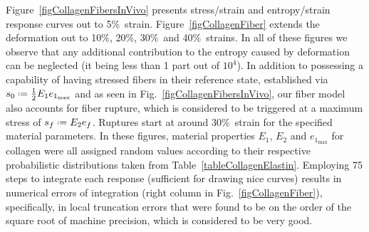 Figure~\ref{figCollagenFibersInVivo} presents stress\slash strain and entropy\slash strain response curves out to 5\%\ strain.  Figure~\ref{figCollagenFiber} extends the deformation out to 10\%, 20\%, 30\%\ and 40\%\ strains.  In all of these figures we observe that any additional contribution to the entropy caused by deformation can be neglected (it being less than 1 part out of $10^4$).  In addition to possessing a capability of having stressed fibers in their reference state, established via $s_0 \defeq \tfrac{1}{2} E_1 e_{1_{\max}}$ and as seen in Fig.~\ref{figCollagenFibersInVivo}, our fiber model also accounts for fiber rupture, which is considered to be triggered at a maximum stress of $s_f \defeq E_2 e_f$.  Ruptures start at around 30\%\ strain for the specified material parameters.  In these figures, material properties  $E_1$, $E_2$ and $e_{1_{\max}}$ for collagen were all assigned random values according to their respective probabilistic distributions taken from Table~\ref{tableCollagenElastin}.  Employing 75 steps to integrate each response (sufficient for drawing nice curves) results in numerical errors of integration (right column in Fig.~\ref{figCollagenFiber}), specifically, in local truncation errors that were found to be on the order of the square root of machine precision, which is considered to be very good.

